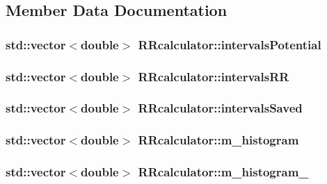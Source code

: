 \subsection{Member Data Documentation}
\hypertarget{class_r_rcalculator_abb337d30cfd2d443d7aa00e62f8d12a0}{
\subsubsection[{intervals\+Potential}]{\setlength{\rightskip}{0pt plus 5cm}std\+::vector$<$double$>$ R\+Rcalculator\+::intervals\+Potential}}\label{class_r_rcalculator_abb337d30cfd2d443d7aa00e62f8d12a0}
\hypertarget{class_r_rcalculator_a9c99b0abb14ec0a15edb6516202f1670}{
\subsubsection[{intervals\+R\+R}]{\setlength{\rightskip}{0pt plus 5cm}std\+::vector$<$double$>$ R\+Rcalculator\+::intervals\+R\+R}}\label{class_r_rcalculator_a9c99b0abb14ec0a15edb6516202f1670}
\hypertarget{class_r_rcalculator_accf15b47a0f368de9dd5a1d758dac8a8}{
\subsubsection[{intervals\+Saved}]{\setlength{\rightskip}{0pt plus 5cm}std\+::vector$<$double$>$ R\+Rcalculator\+::intervals\+Saved}}\label{class_r_rcalculator_accf15b47a0f368de9dd5a1d758dac8a8}
\hypertarget{class_r_rcalculator_ad7f152f6ec71894388eca83acce27c82}{
\subsubsection[{m\+\_\+histogram}]{\setlength{\rightskip}{0pt plus 5cm}std\+::vector$<$double$>$ R\+Rcalculator\+::m\+\_\+histogram}}\label{class_r_rcalculator_ad7f152f6ec71894388eca83acce27c82}
\hypertarget{class_r_rcalculator_a1a62706d3af65ec918550715e4748666}{
\subsubsection[{m\+\_\+histogram\+\_\+0}]{\setlength{\rightskip}{0pt plus 5cm}std\+::vector$<$double$>$ R\+Rcalculator\+::m\+\_\+histogram\+\_}}\label{class_r_rcalculator_a1a62706d3af65ec918550715e4748666}
